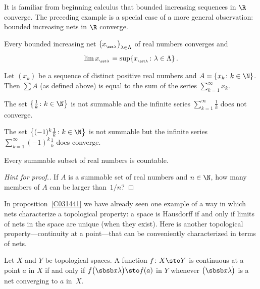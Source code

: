 It is familiar from beginning calculus that bounded increasing sequences in $\R$
converge. The preceding example is a special case of a more general observation: bounded
increasing nets in $\R$ converge.

\begin{prop}\label{C031461} Every bounded increasing net
$\bigl(x_{{}_{\sst \lambda}}\bigr)_{\lambda \in \Lambda}$ of real numbers converges and
  \[ \lim x_{{}_{\sst \lambda}} = \sup\{x_{{}_{\sst \lambda}}\colon \lambda \in \Lambda\}\,. \]
\end{prop}

\begin{exam} Let $(x_k)$ be a sequence of distinct positive real numbers and $A = \{x_k \colon k \in \N\}$.
Then $\sum A$ (as defined above) is equal to the sum of the series $\sum_{k=1}^\infty
x_k$.
\end{exam}

\begin{exam} The set $\bigl\{\frac1k \colon k \in \N \bigr\}$ is not summable and the infinite
series $\sum_{k=1}^\infty \frac1k$ does not converge.
\end{exam}

\begin{exam} The set $\bigl\{(-1)^k \frac1k\colon k \in \N \bigr\}$ is not summable but the
infinite series $\sum_{k=1}^\infty (-1)^k \frac1k$ does converge.
\end{exam}

\begin{prop} Every summable subset of real numbers is countable.
\end{prop}

\begin{proof}[\emph{Hint for proof.}] If $A$ is a summable set of real numbers and $n \in \N$,
how many members of $A$ can be larger than~$1/n$?  \ns
\end{proof}

In proposition~\ref{C031441} we have already seen one example of a way in which nets
characterize a topological property: a space is Hausdorff if and only if limits of nets
in the space are unique (when they exist).  Here is another topological
property---continuity at a point---that can be conveniently characterized in terms of
nets.

\begin{prop}\label{C031471}  Let $X$ and $Y$ be topological spaces.  A function
$f\colon X \sto Y$ is continuous at a point $a$ in $X$ if and only if $f\bigl(\sbsb x\lambda\bigr) \sto f(a)$ in $Y$
whenever $\bigl(\sbsb x\lambda\bigr)$ is a net converging to $a$ in~$X$.
\end{prop}

